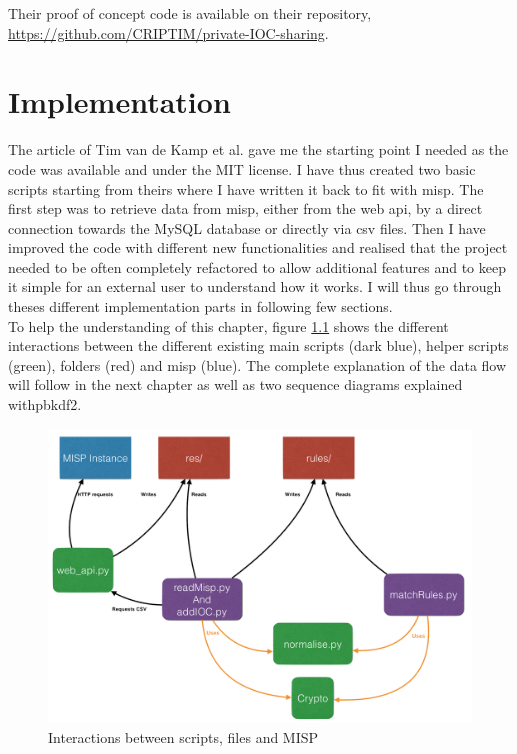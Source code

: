 \documentclass{eplmastersthesis}
\begin{document}
Their proof of concept code is available on their repository, \url{https://github.com/CRIPTIM/private-IOC-sharing}. 




\chapter{Implementation}
\label{chap:Implementation}

The article of Tim van de Kamp et al. gave me the starting point I needed as the code was available and under the MIT license. I have thus created two basic scripts starting from theirs where I have written it back to fit with \gls{misp}.
The first step was to retrieve data from \gls{misp}, either from the web \gls{api}, by a direct connection towards the MySQL database or directly via \gls{csv} files.
Then I have improved the code with different new functionalities and realised that the project needed to be often completely refactored to allow additional features and to keep it simple for an external user to understand how it works. I will thus go through theses different implementation parts in following few sections.\\

To help the understanding of this chapter, figure \ref{interactions} shows the different interactions between the different existing main scripts (dark blue), helper scripts (green), folders (red) and \gls{misp} (blue). The complete explanation of the data flow will follow in the next chapter as well as two sequence diagrams explained with\gls{pbkdf2}. 

\begin{figure}
\centering
\includegraphics[scale=0.4]{res/interactions}
\caption{Interactions between scripts, files and MISP}
\label{interactions}
\end{figure}
\end{document}
